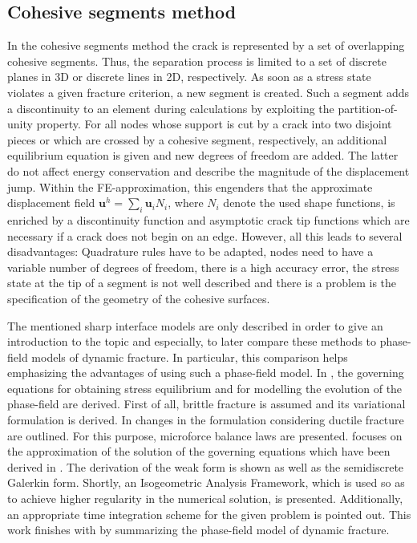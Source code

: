 \subsection{Cohesive segments method} \label{sec:intro_cohes}
In the cohesive segments method the crack is represented by a set of overlapping cohesive segments. Thus, the separation process is limited to a set of discrete planes in 3D or discrete lines in 2D, respectively. As soon as a stress state violates a given fracture criterion, a new segment is created. Such a segment adds a discontinuity to an element during calculations by exploiting the partition-of-unity property. For all nodes whose support is cut by a crack into two disjoint pieces or which are crossed by a cohesive segment, respectively, an additional equilibrium equation is given and new degrees of freedom are added. The latter do not affect energy conservation and describe the magnitude of the displacement jump. Within the FE-approximation, this engenders that the approximate displacement field $\mathbf{u}^{h}=\sum_{i}\mathbf{u}_{i}N_{i}$, where $N_{i}$ denote the used shape functions, is enriched by a discontinuity function and asymptotic crack tip functions which are necessary if a crack does not begin on an edge. However, all this leads to several disadvantages: Quadrature rules have to be adapted, nodes need to have a variable number of degrees of freedom, there is a high accuracy error, the stress state at the tip of a segment is not well described and there is a problem is the specification of the geometry of the cohesive surfaces. \cite{02_SotA_cohes}\cite{01_SotA_cohes_dyn}

The mentioned sharp interface models are only described in order to give an introduction to the topic and especially, to later compare these methods to phase-field models of dynamic fracture. In particular, this comparison helps emphasizing the advantages of using such a phase-field model. In , the governing equations for obtaining stress equilibrium and for modelling the evolution of the phase-field are derived. First of all, brittle fracture is assumed and its variational formulation is derived. In  changes in the formulation considering ductile fracture are outlined. For this purpose, microforce balance laws are presented.   focuses on the approximation of the solution of the governing equations which have been derived in . The derivation of the weak form is shown as well as the semidiscrete Galerkin form. Shortly, an Isogeometric Analysis Framework, which is used so as to achieve higher regularity in the numerical solution, is presented. Additionally, an appropriate time integration scheme for the given problem is pointed out. This work finishes with  by summarizing the phase-field model of dynamic fracture.




